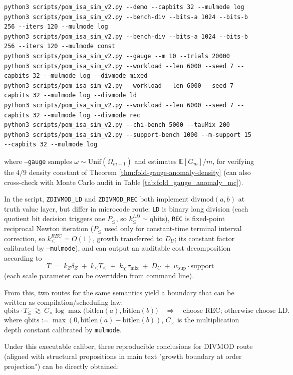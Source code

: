 \begin{remark}
\begin{verbatim}
python3 scripts/pom_isa_sim_v2.py --demo --capbits 32 --mulmode log
python3 scripts/pom_isa_sim_v2.py --bench-div --bits-a 1024 --bits-b 256 --iters 120 --mulmode log
python3 scripts/pom_isa_sim_v2.py --bench-div --bits-a 1024 --bits-b 256 --iters 120 --mulmode const
python3 scripts/pom_isa_sim_v2.py --gauge --m 10 --trials 20000
python3 scripts/pom_isa_sim_v2.py --workload --len 6000 --seed 7 --capbits 32 --mulmode log --divmode mixed
python3 scripts/pom_isa_sim_v2.py --workload --len 6000 --seed 7 --capbits 32 --mulmode log --divmode ld
python3 scripts/pom_isa_sim_v2.py --workload --len 6000 --seed 7 --capbits 32 --mulmode log --divmode rec
python3 scripts/pom_isa_sim_v2.py --chi-bench 5000 --tauMix 200
python3 scripts/pom_isa_sim_v2.py --support-bench 1000 --m-support 15 --capbits 32 --mulmode log
\end{verbatim}
where \texttt{--gauge} samples \(\omega\sim\mathrm{Unif}(\Omega_{m+1})\) and estimates \(\mathbb{E}[G_m]/m\), for verifying
the \(4/9\) density constant of Theorem \ref{thm:fold-gauge-anomaly-density} (can also cross-check with Monte Carlo audit in Table \ref{tab:fold_gauge_anomaly_mc}).
\par
In the script, \texttt{ZDIVMOD\_LD} and \texttt{ZDIVMOD\_REC} both implement \(\mathrm{divmod}(a,b)\) at truth value layer, but differ in microcode route:
\texttt{LD} is binary long division (each quotient bit decision triggers one \(P_{\le}\), so \(k_{\le}^{LD}\sim \mathrm{qbits}\)),
\texttt{REC} is fixed-point reciprocal Newton iteration (\(P_{\le}\) used only for constant-time terminal interval correction, so \(k_{\le}^{REC}=O(1)\), growth transferred to \(D_U\); its constant factor calibrated by \texttt{--mulmode}), and can output an auditable cost decomposition according to
\[
T\;=\;k_Z\delta_Z\;+\;k_{\le}T_{\le}\;+\;k_\chi\,\tau_{\mathrm{mix}}\;+\;D_U\;+\;w_{\mathrm{sup}}\cdot \mathrm{support}
\]
(each scale parameter can be overridden from command line).
\par
From this, two routes for the same semantics yield a boundary that can be written as compilation/scheduling law:
\[
\mathrm{qbits}\cdot T_{\le}\ \gtrsim\ C_{\times}\log \max\bigl(\mathrm{bitlen}(a),\mathrm{bitlen}(b)\bigr)\quad\Longrightarrow\quad \text{choose REC; otherwise choose LD.}
\]
where \(\mathrm{qbits}:=\max(0,\mathrm{bitlen}(a)-\mathrm{bitlen}(b))\), \(C_{\times}\) is the multiplication depth constant calibrated by \texttt{mulmode}.
\par
Under this executable caliber, three reproducible conclusions for DIVMOD route (aligned with structural propositions in main text "growth boundary at order projection") can be directly obtained:

\end{remark}
